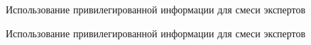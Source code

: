 \documentclass{beamer}
\begin{document}
\begin{frame}{Использование привилегированной информации для смеси экспертов}

\begin{figure}[!htb]
\end{figure}


\end{frame}

\begin{frame}{Использование привилегированной информации для смеси экспертов}

\begin{figure}[!htb]
\end{figure}



\end{frame}
\end{document}
